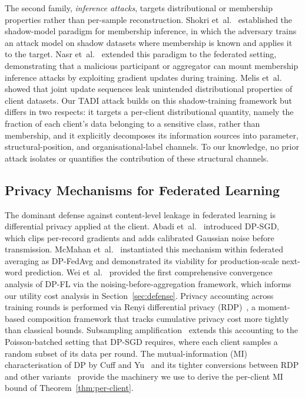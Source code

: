 \documentclass[letterpaper,journal]{IEEEtran}
\newcommand{\TADI}{\textsc{TADI}\xspace}
\begin{document}
The second family, \textit{inference attacks}, targets distributional
or membership properties rather than per-sample reconstruction.
Shokri et~al.~\cite{shokri2017membership} established the
shadow-model paradigm for membership inference, in which the
adversary trains an attack model on shadow datasets where membership
is known and applies it to the target. Nasr et~al.~\cite{nasr2019comprehensive} extended this paradigm to
the federated setting, demonstrating that a malicious participant or
aggregator can mount membership inference attacks by exploiting
gradient updates during training. Melis
et~al.~\cite{melis2019exploiting} showed that joint update sequences
leak unintended distributional properties of client datasets. Our
\TADI attack builds on this shadow-training framework but differs in
two respects: it targets a per-client distributional quantity, namely
the fraction of each client's data belonging to a sensitive class,
rather than membership, and it explicitly decomposes its information
sources into parameter, structural-position, and organisational-label
channels. To our knowledge, no prior attack isolates or quantifies
the contribution of these structural channels.

\subsection{Privacy Mechanisms for Federated Learning}
\label{sec:related-defense}

The dominant defense against content-level leakage in federated
learning is differential privacy applied at the client. Abadi
et~al.~\cite{abadi2016dpsgd} introduced DP-SGD, which clips
per-record gradients and adds calibrated Gaussian noise before
transmission. McMahan et~al.~\cite{mcmahan2018dpfedavg} instantiated
this mechanism within federated averaging as DP-FedAvg and demonstrated
its viability for production-scale next-word prediction. Wei et~al.~\cite{wei2020nbafl} provided the first comprehensive convergence
analysis of DP-FL via the noising-before-aggregation framework, which
informs our utility cost analysis in Section~\ref{sec:defense}.
Privacy accounting across training rounds is performed via Renyi
differential privacy (RDP)~\cite{mironov2017rdp}, a moment-based
composition framework that tracks cumulative privacy cost more tightly
than classical bounds. Subsampling amplification~\cite{wang2019subsampled}
extends this accounting to the Poisson-batched setting that DP-SGD
requires, where each client samples a random subset of its data per
round. The mutual-information (MI) characterisation of DP by Cuff and
Yu~\cite{cuff2016mi} and its tighter conversions between RDP and other
variants~\cite{asoodeh2021variants} provide the machinery we use to
derive the per-client MI bound of Theorem~\ref{thm:per-client}.
\end{document}
